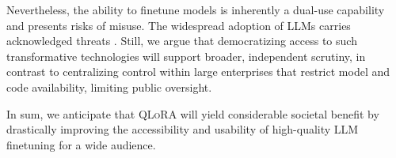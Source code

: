 Nevertheless, the ability to finetune models is inherently a dual-use capability and presents risks of misuse. The widespread adoption of LLMs carries acknowledged threats \citep{bommasani2021opportunities,bender2021dangers}. Still, we argue that democratizing access to such transformative technologies will support broader, independent scrutiny, in contrast to centralizing control within large enterprises that restrict model and code availability, limiting public oversight.

In sum, we anticipate that \textsc{QLoRA} will yield considerable societal benefit by drastically improving the accessibility and usability of high-quality LLM finetuning for a wide audience.